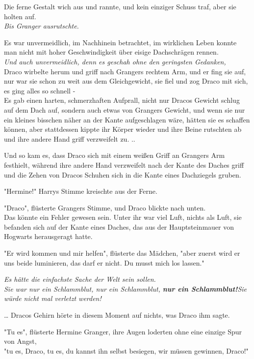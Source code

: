 {Die ferne Gestalt wich aus und rannte, und kein einziger Schuss traf, aber sie holten auf.\\ \emph{\hfill\break Bis Granger ausrutschte.}

Es war unvermeidlich, im Nachhinein betrachtet, im wirklichen Leben konnte man nicht mit hoher Geschwindigkeit über eisige Dachschrägen rennen.\\ \emph{Und auch unvermeidlich, denn es geschah ohne den geringsten Gedanken,}\\ Draco wirbelte herum und griff nach Grangers rechtem Arm, und er fing sie auf, nur war sie schon zu weit aus dem Gleichgewicht, sie fiel und zog Draco mit sich, es ging alles so schnell -\\ Es gab einen harten, schmerzhaften Aufprall, nicht nur Dracos Gewicht schlug auf dem Dach auf, sondern auch etwas von Grangers Gewicht, und wenn sie nur ein kleines bisschen näher an der Kante aufgeschlagen wäre, hätten sie es schaffen können, aber stattdessen kippte ihr Körper wieder und ihre Beine rutschten ab und ihre andere Hand griff verzweifelt zu. ..

Und so kam es, dass Draco sich mit einem weißen Griff an Grangers Arm festhielt, während ihre andere Hand verzweifelt nach der Kante des Daches griff und die Zehen von Dracos Schuhen sich in die Kante eines Dachziegels gruben.

"Hermine!" Harrys Stimme kreischte aus der Ferne.

"Draco", flüsterte Grangers Stimme, und Draco blickte nach unten.\\ Das könnte ein Fehler gewesen sein. Unter ihr war viel Luft, nichts als Luft, sie befanden sich auf der Kante eines Daches, das aus der Hauptsteinmauer von Hogwarts herausgeragt hatte.

"Er wird kommen und mir helfen", flüsterte das Mädchen, "aber zuerst wird er uns beide luminieren, das darf er nicht. Du musst mich los lassen."

\emph{Es hätte die einfachste Sache der Welt sein sollen.}\\ \emph{Sie war nur ein Schlammblut, nur ein Schlammblut,} \textbf{\emph{nur ein Schlammblut!}}\emph{\hfill\break Sie würde nicht mal verletzt werden!}

… Dracos Gehirn hörte in diesem Moment auf nichts, was Draco ihm sagte.

"Tu es", flüsterte Hermine Granger, ihre Augen loderten ohne eine einzige Spur von Angst,\\ "tu es, Draco, tu es, du kannst ihn selbst besiegen, wir müssen gewinnen, Draco!"

}
